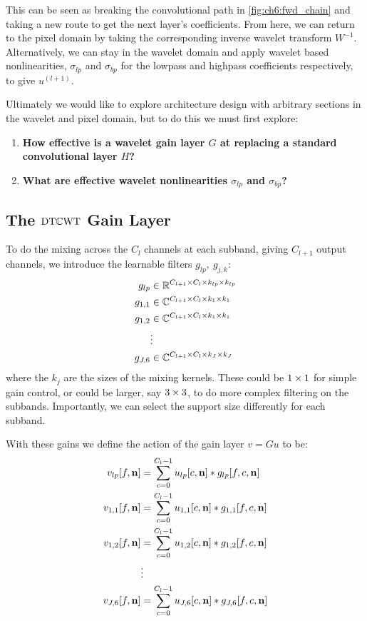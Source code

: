 This can be seen as breaking the convolutional path in
\autoref{fig:ch6:fwd_chain} and taking a new route to get the next layer's
coefficients. From here, we can return to the pixel domain by taking the
corresponding inverse wavelet transform $W^{-1}$. Alternatively, we
can stay in the wavelet domain and apply wavelet based nonlinearities,
$\sigma_{lp}$ and $\sigma_{bp}$ for the lowpass and highpass coefficients
respectively, to give $u^{(l+1)}$. 

Ultimately we would like to explore architecture design with arbitrary sections
in the wavelet and pixel domain, but to do this we must first explore: 
\begin{enumerate}[itemsep=5pt,parsep=5pt,topsep=0pt]
  \item \textbf{How effective is a wavelet gain layer $G$ at replacing a
    standard convolutional layer $H$?}
  \item \textbf{What are effective wavelet nonlinearities $\sigma_{lp}$ and $\sigma_{bp}$?}
\end{enumerate}

\subsection{The $\DTCWT$ Gain Layer}
To do the mixing across the $C_l$ channels at each subband, giving $C_{l+1}$
output channels, we introduce the learnable filters $g_{lp},\ g_{j,k}$:
%
\begin{align}
  g_{lp} &\in \reals[C_{l+1}\x C_l\x k_{lp}\x k_{lp}] \label{eq:ch6:glp} \\
  g_{1,1} &\in \complexes[C_{l+1}\x C_l\x k_1\x k_1] \\
  g_{1,2} &\in \complexes[C_{l+1}\x C_l\x k_1\x k_1] \\
      & \vdots \nonumber \\
  g_{J,6} &\in \complexes[C_{l+1}\x C_l\x k_J\x k_J]  \label{eq:ch6:gj6}
\end{align}
%
where the $k_j$ are the sizes of the mixing kernels. These could be $1\x 1$ for
simple gain control, or could be larger, say $3\x 3$, to do more complex
filtering on the subbands. Importantly, we can select the support size
differently for each subband.

With these gains we define the action of the gain layer $v = Gu$ to be:
\begin{align} 
  v_{lp}[f, \nn] &=  \sum_{c=0}^{C_l-1} u_{lp}[c, \nn] \conv g_{lp}[f, c, \nn] \label{eq:ch6:gain1} \\
  v_{1,1}[f, \nn] &=  \sum_{c=0}^{C_l-1} u_{1,1}[c, \nn] \conv g_{1,1}[f, c, \nn] \\
  v_{1,2}[f, \nn] &=  \sum_{c=0}^{C_l-1} u_{1,2}[c, \nn] \conv g_{1,2}[f, c, \nn] \\
                  & \vdots \nonumber \\
  v_{J,6}[f, \nn] &=  \sum_{c=0}^{C_l-1} u_{J,6}[c, \nn] \conv g_{J,6}[f, c, \nn] \label{eq:ch:gain2}
\end{align}

